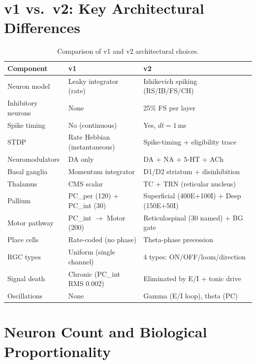 \documentclass[11pt,a4paper]{article}
\begin{document}
\section{v1 vs.\ v2: Key Architectural Differences}\label{sec:v1_vs_v2}

\begin{table}[H]
\centering
\caption{Comparison of v1 and v2 architectural choices.}
\label{tab:v1v2}
\small
\begin{tabular}{lll}
\toprule
Component & v1 & v2 \\
\midrule
Neuron model          & Leaky integrator (rate)        & Izhikevich spiking (RS/IB/FS/CH) \\
Inhibitory neurons    & None                           & 25\% FS per layer \\
Spike timing          & No (continuous)                & Yes, $dt = 1$\,ms \\
STDP                  & Rate Hebbian (instantaneous)   & Spike-timing + eligibility trace \\
Neuromodulators       & DA only                        & DA + NA + 5-HT + ACh \\
Basal ganglia         & Momentum integrator            & D1/D2 striatum + disinhibition \\
Thalamus              & CMS scalar                     & TC + TRN (reticular nucleus) \\
Pallium               & PC\_per (120) + PC\_int (30)   & Superficial (400E+100I) + Deep (150E+50I) \\
Motor pathway         & PC\_int $\to$ Motor (200)      & Reticulospinal (30 named) + BG gate \\
Place cells           & Rate-coded (no phase)          & Theta-phase precession \\
RGC types             & Uniform (single channel)       & 4 types: ON/OFF/loom/direction \\
Signal death          & Chronic (PC\_int RMS 0.002)    & Eliminated by E/I + tonic drive \\
Oscillations          & None                           & Gamma (E/I loop), theta (PC) \\
\bottomrule
\end{tabular}
\end{table}

\section{Neuron Count and Biological Proportionality}\label{sec:proportions}
\end{document}
